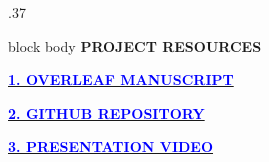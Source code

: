 \documentclass[aspectratio=169,10pt]{beamer}
\begin{document}
\begin{frame}[plain]
\begin{columns}[T,onlytextwidth]
\begin{column}{.37\textwidth}
\begin{beamercolorbox}[rounded=true,sep=.55em,wd=\linewidth,left]{block body}
{\color{muted}\scriptsize\bfseries PROJECT RESOURCES}\par\vspace{.18em}
\href{https://www.overleaf.com/project/6adbd768cbee7aeb66bcd5f9/share\#1b64dd9bd84fd0003f81626d5a4e47af269068164341fd83}{\textcolor{blue}{\small\bfseries 1. OVERLEAF MANUSCRIPT}}\par\vspace{.14em}
\href{https://github.com/darioXxx32/Algorithm-analysis/tree/main/Adam-Analysis}{\textcolor{blue}{\small\bfseries 2. GITHUB REPOSITORY}}\par\vspace{.14em}
\href{https://drive.google.com/drive/folders/1WUl1pRtYdUr3mXK9QRBEN3LEOtXKuQGO?usp=drive_link}{\textcolor{blue}{\small\bfseries 3. PRESENTATION VIDEO}}
\end{beamercolorbox}\end{column}
\end{columns}\end{frame}
\end{document}
